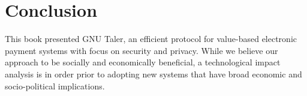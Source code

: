 %
%
%
%
%
%
%

\chapter{Conclusion}\label{chapter:conclusion}


This book presented GNU Taler, an efficient protocol for
value-based electronic payment systems with focus on security and
privacy.  While we believe our approach to be socially and economically beneficial, a
technological impact analysis is in order prior to adopting new
systems that have broad economic and socio-political implications.

